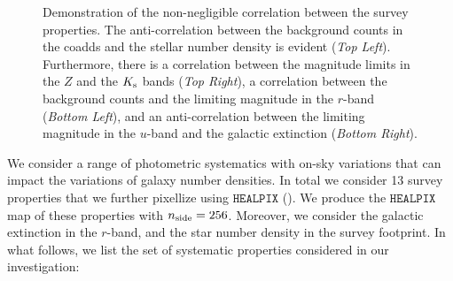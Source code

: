 \documentclass[fleqn,usenatbib,useAMS]{mnras}
\newcommand{\healpix}{\mathtt{HEALPIX}}
\begin{document}
\begin{figure}
\begin{tabular}{cc}
\end{tabular}
\caption{\label{fig:sys_sys_correlation} Demonstration of the non-negligible correlation between the survey properties. The anti-correlation between the background counts in the coadds and the stellar number density is evident (\textit{Top Left}). Furthermore, there is a correlation between the magnitude limits in the $Z$ and the $K_{\rm s}$ bands (\textit{Top Right}), a correlation between the background counts and the limiting magnitude in the $r$-band (\textit{Bottom Left}), and an anti-correlation between the limiting magnitude in the $u$-band and the galactic extinction (\textit{Bottom Right}).} 
\end{figure}


We consider a range of photometric systematics with on-sky variations that can impact the variations of galaxy number densities. In total we consider 13 survey properties that we further pixellize using $\healpix$ (\citealt{healpix}). We produce the $\healpix$ map of these properties with $n_{\rm side} = 256$. Moreover, we consider the galactic extinction in the $r$-band, and the star number density in the survey footprint. In what follows, we list the set of systematic properties considered in our investigation:
\end{document}
